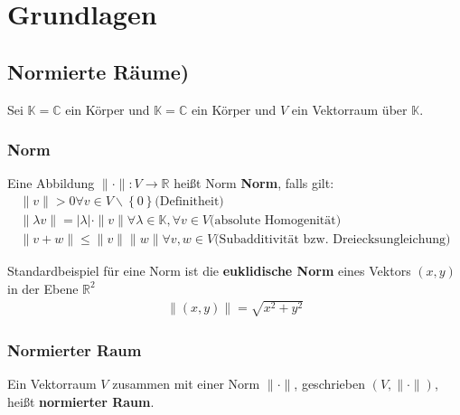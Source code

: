 \section{Grundlagen}

\subsection{Normierte Räume)}

Sei $\mathbb{K}=\mathbb{C}$ ein Körper und $\mathbb{K}=\mathbb{C}$ ein Körper und $V$ ein Vektorraum über $\mathbb{K}$.

\subsubsection{Norm}
Eine Abbildung $\|\cdot\|:V\longrightarrow\mathbb{R}$ heißt Norm \textbf{Norm}, falls gilt:
\begin{align*}
	\|v\|  >  0  \forall  v  \in  V\backslash\left\lbrace 0 \right\rbrace \text{(Definitheit)} \\
	\|\lambda v\|  =  |\lambda|\cdot\|v\|  \forall\lambda  \in  \mathbb{K},\forall v\in V\text{(absolute Homogenität)}\\
	\|v+w\| \le \| v\| \| w\| \forall v,w \in V \text{(Subadditivität bzw. Dreiecksungleichung)}
\end{align*}

Standardbeispiel für eine Norm ist die \textbf{euklidische Norm} eines Vektors $(x,y)$ in der Ebene $\mathbb{R}^2$
\begin{align*}
	\|(x,y)\| = \sqrt{x^2+y^2}
\end{align*}

\subsubsection{Normierter Raum}
Ein Vektorraum $V$ zusammen mit einer Norm $\|\cdot\|$, geschrieben $(V, \|\cdot\|)$, heißt \textbf{normierter Raum}.